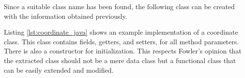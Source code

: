 Since a suitable class name has been found, the following class can be created with the information obtained previously. 

Listing \ref{lst:coordinate_java} shows an example implementation of a coordinate class. This class contains fields, getters, and setters, for all method parameters. There is also a constructor for initialization. This respects Fowler's opinion that the extracted class should not be a mere data class but a functional class that can be easily extended and modified.








\hfill
